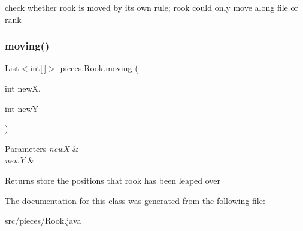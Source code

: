 check whether rook is moved by its own rule; rook could only move along file or rank \mbox{\label{classpieces_1_1_rook_a45ac73bc8b0a1b8efac9ec3b6398bb2c}} 
\subsubsection{\texorpdfstring{moving()}{moving()}}
{\footnotesize\ttfamily List$<$int\mbox{[}$\,$\mbox{]}$>$ pieces.\+Rook.\+moving (\begin{DoxyParamCaption}\item[{int}]{newX,  }\item[{int}]{newY }\end{DoxyParamCaption})\hspace{0.3cm}{\ttfamily [inline]}}


\begin{DoxyParams}{Parameters}
{\em newX} & \\
\hline
{\em newY} & \\
\hline
\end{DoxyParams}
\begin{DoxyReturn}{Returns}
store the positions that rook has been leaped over 
\end{DoxyReturn}


The documentation for this class was generated from the following file\+:\begin{DoxyCompactItemize}
\item 
src/pieces/Rook.\+java\end{DoxyCompactItemize}
